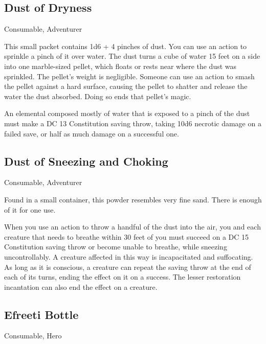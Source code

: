 \subsection{Dust of Dryness}
Consumable, Adventurer

This small packet contains 1d6 + 4 pinches of dust. You can use an action to sprinkle a pinch of it over water. The dust turns a cube of water 15 feet on a side into one marble-sized pellet, which floats or rests near where the dust was sprinkled. The pellet's weight is negligible.
Someone can use an action to smash the pellet against a hard surface, causing the pellet to shatter and release the water the dust absorbed. Doing so ends that pellet's magic.

An elemental composed mostly of water that is exposed to a pinch of the dust must make a DC 13 Constitution saving throw, taking 10d6 necrotic damage on a failed save, or half as much damage on a successful one.

\subsection{Dust of Sneezing and Choking}
Consumable, Adventurer

Found in a small container, this powder resembles very fine sand. There is enough of it for one use.

When you use an action to throw a handful of the dust into the air, you and each creature that needs to breathe within 30 feet of you must succeed on a DC 15 Constitution saving throw or become unable to breathe, while sneezing uncontrollably. A creature affected in this way is incapacitated and suffocating. As long as it is conscious, a creature can repeat the saving throw at the end of each of its turns, ending the effect on it on a success. The lesser restoration incantation can also end the effect on a creature.

\subsection{Efreeti Bottle}
Consumable, Hero

